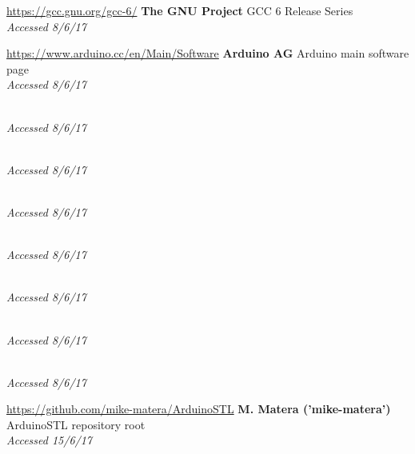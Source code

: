 \documentclass[a4paper]{article}
\begin{document}
\begin{thebibliography}{9}
\url{https://gcc.gnu.org/gcc-6/}
\textbf{The GNU Project}
GCC 6 Release Series
\\\textit{Accessed 8/6/17}

\url{https://www.arduino.cc/en/Main/Software}
\textbf{Arduino AG}
Arduino main software page
\\\textit{Accessed 8/6/17}

\url{}
\textbf{}
\\\textit{Accessed 8/6/17}

\url{}
\textbf{}
\\\textit{Accessed 8/6/17}

\url{}
\textbf{}
\\\textit{Accessed 8/6/17}


\url{}
\textbf{}
\\\textit{Accessed 8/6/17}

\url{}
\textbf{}
\\\textit{Accessed 8/6/17}


\url{}
\textbf{}
\\\textit{Accessed 8/6/17}

\bibitem{}
\url{}
\textbf{}
\\\textit{Accessed 8/6/17}


\url{https://github.com/mike-matera/ArduinoSTL}
\textbf{M. Matera ('mike-matera')}
ArduinoSTL repository root
\\\textit{Accessed 15/6/17}

\bibitem{}
\url{}
\textbf{}



\bibitem{}
\url{}
\textbf{}
\\\textit{}

\end{thebibliography}
\end{document}
